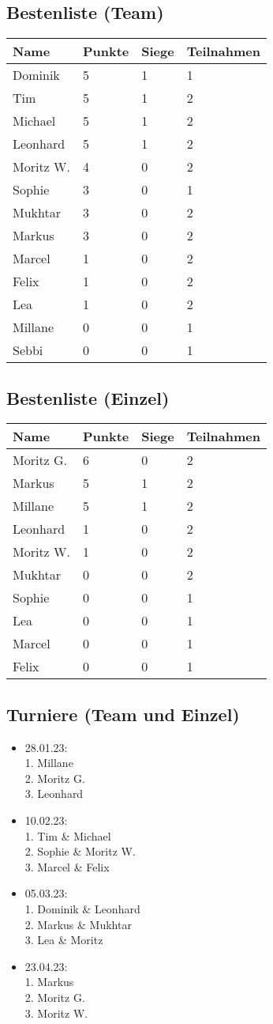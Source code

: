 \documentclass[a4paper,11pt]{scrartcl}
\newcommand{\entry}[4]{#1 & #2 & #3 & #4\\}
\newcommand{\event}[4]{\item #1:\\1. #2\\2. #3\\3. #4}
\begin{document}
    \subsection{Bestenliste (Team)}
        \begin{tabularx}{\textwidth}[h]{XXXX}
            \hline\hline
            Name & Punkte & Siege & Teilnahmen\\
            \hline\hline
            \entry{Dominik}{5}{1}{1}
            \hline
            \entry{Tim}{5}{1}{2}
            \hline
            \entry{Michael}{5}{1}{2}
            \hline
            \entry{Leonhard}{5}{1}{2}
            \hline
            \entry{Moritz W.}{4}{0}{2}
            \hline
            \entry{Sophie}{3}{0}{1}
            \hline
            \entry{Mukhtar}{3}{0}{2}
            \hline
            \entry{Markus}{3}{0}{2}
            \hline
            \entry{Marcel}{1}{0}{2}
            \hline
            \entry{Felix}{1}{0}{2}
            \hline
            \entry{Lea}{1}{0}{2}
            \hline
            \entry{Millane}{0}{0}{1}
            \hline
            \entry{Sebbi}{0}{0}{1}
            \hline\hline
        \end{tabularx}
    
    \subsection{Bestenliste (Einzel)}
        \begin{tabularx}{\textwidth}[h]{XXXX}
            \hline\hline
            Name & Punkte & Siege & Teilnahmen\\
            \hline\hline
            \entry{Moritz G.}{6}{0}{2}
            \hline
            \entry{Markus}{5}{1}{2}
            \hline
            \entry{Millane}{5}{1}{2}
            \hline
            \entry{Leonhard}{1}{0}{2}
            \hline
            \entry{Moritz W.}{1}{0}{2}
            \hline
            \entry{Mukhtar}{0}{0}{2}
            \hline
            \entry{Sophie}{0}{0}{1}
            \hline
            \entry{Lea}{0}{0}{1}
            \hline
            \entry{Marcel}{0}{0}{1}
            \hline
            \entry{Felix}{0}{0}{1}
            \hline\hline
        \end{tabularx}

    \subsection{Turniere (Team und Einzel)}

    \begin{itemize}
        \event{28.01.23}
            {Millane}
            {Moritz G.}
            {Leonhard}
        \event{10.02.23}
            {Tim \& Michael}
            {Sophie \& Moritz W.}
            {Marcel \& Felix}
        \event{05.03.23}
            {Dominik \& Leonhard}
            {Markus \& Mukhtar}
            {Lea \& Moritz}
        \event{23.04.23}
            {Markus}
            {Moritz G.}
            {Moritz W.}
    \end{itemize}
\end{document}

